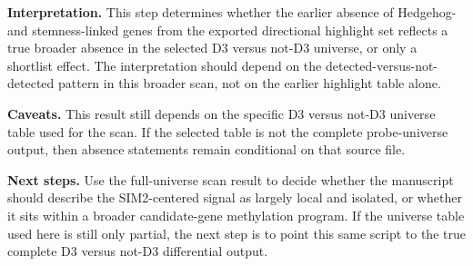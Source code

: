 \textbf{Interpretation.}
This step determines whether the earlier absence of Hedgehog- and stemness-linked genes from the exported directional highlight set reflects a true broader absence in the selected D3 versus not-D3 universe, or only a shortlist effect. The interpretation should depend on the detected-versus-not-detected pattern in this broader scan, not on the earlier highlight table alone.

\textbf{Caveats.}
This result still depends on the specific D3 versus not-D3 universe table used for the scan. If the selected table is not the complete probe-universe output, then absence statements remain conditional on that source file.

\textbf{Next steps.}
Use the full-universe scan result to decide whether the manuscript should describe the SIM2-centered signal as largely local and isolated, or whether it sits within a broader candidate-gene methylation program. If the universe table used here is still only partial, the next step is to point this same script to the true complete D3 versus not-D3 differential output.
